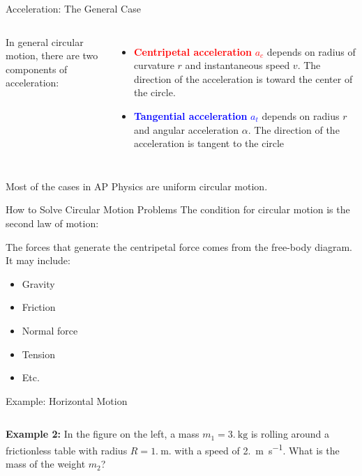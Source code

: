 \documentclass[12pt,compress,aspectratio=169]{beamer}
\begin{document}
\begin{frame}{Acceleration: The General Case}
  \begin{columns}
    
    In general circular motion, there are two components of acceleration:
    \begin{itemize}
    \item\textcolor{red}{\textbf{Centripetal acceleration} $a_c$} depends on
      radius of curvature $r$ and instantaneous speed $v$. The direction of
      the acceleration is toward the center of the circle.
    \item \textcolor{blue}{\textbf{Tangential acceleration} $a_t$}
      depends on radius $r$  and angular acceleration $\alpha$. The direction
      of the acceleration is tangent to the circle
    \end{itemize}
  \end{columns}

  \vspace{.2in}Most of the cases in AP Physics are uniform circular motion.
\end{frame}



\begin{frame}{How to Solve Circular Motion Problems}
  The condition for circular motion is the second law of motion:

  
  The forces that generate the centripetal force comes from the free-body
  diagram. It may include:
  \begin{itemize}
  \item Gravity
  \item Friction
  \item Normal force
  \item Tension
  \item Etc.
  \end{itemize}
\end{frame}



\begin{frame}{Example: Horizontal Motion}
  \begin{columns}
    
    \textbf{Example 2:} In the figure on the left, a mass
    $m_1=\SI{3.}{\kilo\gram}$ is rolling around a frictionless table with
    radius $R=\SI{1.}{\metre}$. with a speed of \SI{2.}{\metre\per\second}.
    What is the mass of the weight $m_2$?
  \end{columns}
\end{frame}
\end{document}
